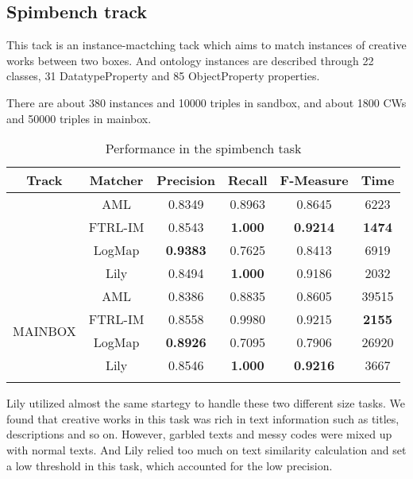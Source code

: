 \documentclass[runningheads]{llncs}
\begin{document}
\subsection{Spimbench track}
This tack is an instance-mactching tack which aims to match instances of creative works between two boxes. And ontology instances are described through 22 classes, 31 DatatypeProperty and 85 ObjectProperty properties. \par
There are about 380 instances and 10000 triples in sandbox, and about 1800 CWs and 50000 triples in mainbox.\par
\begin{table}[H]
\caption{Performance in the spimbench task} \label{tab:perf_im_author_dis}
\centering
\begin{tabular}{c|c|c|c|c|c}
\Xhline{1.5pt}
Track & Matcher & Precision & Recall & F-Measure & Time  \\ \hline
\Xhline{0.5pt}
\multirow{4}{*}{SANDBOX } & AML & 0.8349 & 0.8963 & 0.8645 & 6223 \\ 
\cline{2-6}
& FTRL-IM & 0.8543 & \textbf{1.000} & \textbf{0.9214} & \textbf{1474} \\ 
\cline{2-6}
& LogMap & \textbf{0.9383} & 0.7625 & 0.8413 & 6919 \\ 
\cline{2-6}
& Lily & 0.8494 & \textbf{1.000} & 0.9186 & 2032 \\ 
\hline

\multirow{4}{*}{MAINBOX} & AML & 0.8386 & 0.8835 & 0.8605 & 39515 \\ 
\cline{2-6}
& FTRL-IM & 0.8558 & 0.9980 & 0.9215 & \textbf{2155} \\ 
\cline{2-6}
& LogMap & \textbf{0.8926} & 0.7095 & 0.7906 & 26920 \\
\cline{2-6}
& Lily & 0.8546 & \textbf{1.000} & \textbf{0.9216} & 3667 \\ 

\Xhline{1.5pt}

\end{tabular}
\end{table}

Lily utilized almost the same startegy to handle these two different size tasks. 
We found that creative works in this task was rich in text information such as titles, descriptions and so on. 
However, garbled texts and messy codes were mixed up with normal texts. 
And Lily relied too much on text similarity calculation and set a low threshold in this task, which accounted for the low precision.\par
\end{document}
